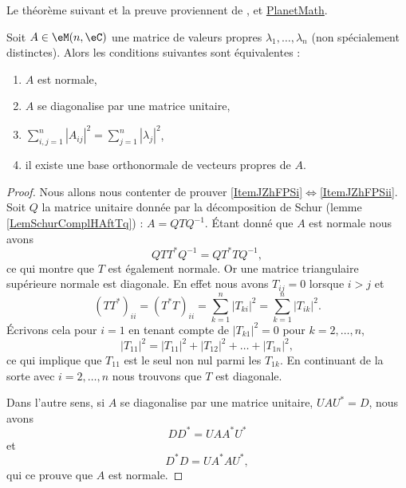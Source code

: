 Le théorème suivant et la preuve proviennent de \cite{LecLinAlgAllen},  et \href{http://planetmath.org/encyclopedia/TheoremForNormalTriangularMatrices.html}{PlanetMath}.
\begin{theorem}
    Soit \( A\in\eM(n,\eC)\) une matrice de valeurs propres \( \lambda_1,\ldots, \lambda_n\) (non spécialement distinctes). Alors les conditions suivantes sont équivalentes :
    \begin{enumerate}
        \item   \label{ItemJZhFPSi}
            \( A\) est normale,
        \item   \label{ItemJZhFPSii}
            \( A\) se diagonalise par une matrice unitaire,
        \item
            \( \sum_{i,j=1}^n| A_{ij} |^2=\sum_{j=1}^n| \lambda_j |^2\),
        \item
            il existe une base orthonormale de vecteurs propres de \( A\).
    \end{enumerate}
\end{theorem}

\begin{proof}
    Nous allons nous contenter de prouver \ref{ItemJZhFPSi}\( \Leftrightarrow\)\ref{ItemJZhFPSii}. Soit \( Q\) la matrice unitaire donnée par la décomposition de Schur (lemme \ref{LemSchurComplHAftTq}) : \( A=QTQ^{-1}\). Étant donné que \( A\) est normale nous avons
    \begin{equation}
        QTT^*Q^{-1}=QT^*TQ^{-1},
    \end{equation}
    ce qui montre que \( T\) est également normale. Or une matrice triangulaire supérieure normale est diagonale. En effet nous avons \( T_{ij}=0\) lorsque \( i>j\) et
    \begin{equation}
        (TT^*)_{ii}=(T^*T)_{ii}=\sum_{k=1}^n| T_{ki} |^2=\sum_{k=1}^n| T_{ik} |^2.
    \end{equation}
    Écrivons cela pour \( i=1\) en tenant compte de \( | T_{k1} |^2=0\) pour \( k=2,\ldots, n\),
    \begin{equation}
        | T_{11} |^2=| T_{11} |^2+| T_{12} |^2+\ldots+| T_{1n} |^2,
    \end{equation}
    ce qui implique que \( T_{11}\) est le seul non nul parmi les \( T_{1k}\). En continuant de la sorte avec \( i=2,\ldots, n\) nous trouvons que \( T\) est diagonale.

    Dans l'autre sens, si \( A\) se diagonalise par une matrice unitaire, \( UAU^*=D\), nous avons
    \begin{equation}
        DD^*=UAA^*U^*
    \end{equation}
    et 
    \begin{equation}
        D^*D=UA^*AU^*,
    \end{equation}
    qui ce prouve que \( A\) est normale.
\end{proof}

